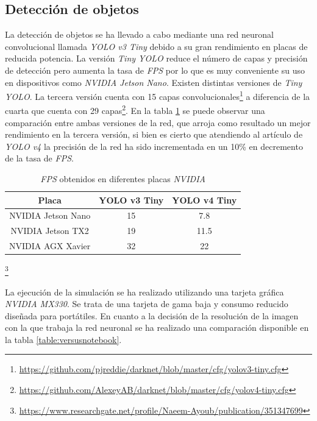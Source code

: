 \subsection{Detección de objetos}
\label{subsection:objectdetector}
La detección de objetos se ha llevado a cabo mediante una red neuronal convolucional llamada \textit{YOLO v3 Tiny} debido a su gran rendimiento en placas de reducida potencia. La versión \textit{Tiny YOLO} reduce el número de capas y precisión de detección pero aumenta la tasa de \textit{FPS} por lo que es muy conveniente su uso en dispositivos como \textit{NVIDIA Jetson Nano}. Existen distintas versiones de \textit{Tiny YOLO}. La tercera versión cuenta con 15 capas convolucionales\footnote{\url{https://github.com/pjreddie/darknet/blob/master/cfg/yolov3-tiny.cfg}} a diferencia de la cuarta que cuenta con 29 capas\footnote{\url{https://github.com/AlexeyAB/darknet/blob/master/cfg/yolov4-tiny.cfg}}. En la tabla \ref{table:v3vsv4} se puede observar una comparación entre ambas versiones de la red, que arroja como resultado un mejor rendimiento en la tercera versión, si bien es cierto que atendiendo al artículo de \textit{YOLO v4} \cite{yolov4} la precisión de la red ha sido incrementada en un 10\% en decremento de la tasa de \textit{FPS}.\\

\begin{table}[H]
	\begin{center}
		\begin{tabular}{|c|c|c|}
			\hline
			\textbf{Placa}   & \textbf{YOLO v3 Tiny}  & \textbf{YOLO v4 Tiny}
			\\
			\hline
			NVIDIA Jetson Nano						& 15									& 7.8
			\\																						
			NVIDIA Jetson TX2   					& 19									& 11.5
			\\
			NVIDIA AGX Xavier     				& 32									& 22
			\\
			\hline
		\end{tabular}
		\caption{\textit{FPS} obtenidos en diferentes placas \textit{NVIDIA}}\footnote{\url{https://www.researchgate.net/profile/Naeem-Ayoub/publication/351347699}}
		\label{table:v3vsv4}
	\end{center}
\end{table}

La ejecución de la simulación se ha realizado utilizando una tarjeta gráfica \textit{NVIDIA MX330}. Se trata de una tarjeta de gama baja y consumo reducido diseñada para portátiles. En cuanto a la decisión de la resolución de la imagen con la que trabaja la red neuronal se ha realizado una comparación disponible en la tabla \ref{table:versusnotebook}. 

